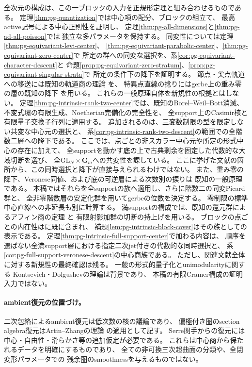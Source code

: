 全次元の構成は、この一ブロックの入力を正規形定理と組み合わせるものである。
定理\ref{thm:pg-quantization}では中心項の配分、ブロックの組立て、
最高active記号による中心正則性を証明し、
定理\ref{thm:pg-all-dimensions}と\ref{thm:pg-ad-all-poisson}では
独立な多パラメータを保持する。
同変性については定理\ref{thm:pg-equivariant-levi-center}、
\ref{thm:pg-equivariant-parabolic-center}、\ref{thm:pg-equivariant-zero-center}で
所定の群への同変な選択を、系\ref{cor:pg-equivariant-character-descent}と
命題\ref{prop:pg-equivariant-zero-stratum}、\ref{prop:pg-equivariant-singular-strata}で
所定の条件下の降下を証明する。
節点・尖点軌道への移送には既知の軌道商の理論
\cite[Propositions~7.12, 7.17]{PMilneGroups}を、
特異点直線の捻りにはgerbe上の重み零の層の既知の降下
\cite[Proposition~4.10, p.~1487]{PBerghSchnurerGerbes}を用いる。
これらの一般原理自体を新規性の根拠とはしない。
定理\ref{thm:pg-intrinsic-rank-two-center}では、既知のBorel--Weil--Bott消滅、
不変式環の有限生成、Noetherian完備化の完全性を、
全support上のCasimir核と有限量子交換子行列に適用する。
追加されるのは、三変数制限の型を限定しない共変な中心元の選択と、
系\ref{cor:pg-intrinsic-rank-two-descent}の範囲での全階数二層への降下である。
ここでは、点ごとの非スカラー中心元や所定の形式中心の存在に加えて、
全supportを動かす底の上で古典剰余を固定した代数的な大域切断を選び、
全$\mathrm{GL}_N\times\mathbf G_m$への共変性を課している。
ここに挙げた文献の箇所から、この同時選択と降下が直接与えられるわけではない。
また、重み零の降下、Veronese同値、および底の可逆層による次数別の捩りは
既知の一般原理である\cite{PBerghSchnurerGerbes,PSmithVeronese,PVdBNoncommP1Bundles}。
本稿ではそれらを全supportの族へ適用し、さらに階数二の同変Picard群と、
全非零階数層の安定化群を用いてgerbeの位数を決定する。
零制限の標準中心直線への非延長も別に計算する。
満supportの構成では、既知の還元群によるアフィン商の定理
\cite[\S2, Proposition~2.2, Theorem~2.1]{PArzhantsevMatsushima}と
有限射影加群の切断の持上げを用いる。
ブロックの点ごとの内在性は\cite[縮約二形式による復元補題]{PoissonCubic}に既に含まれ、
補題\ref{lem:pg-intrinsic-block-cover}はその族としての表示である。
定理\ref{thm:pg-intrinsic-full-support-center}で加わる内容は、
順序を選ばない全満support層における指定二次jet付きの代数的な同時選択と、
系\ref{cor:pg-full-support-veronese-descent}の中心商族である。
ただし、関連文献全体に対する新規性の最終確認は残る。
一般の形式的量子化とunimodularityに関する
Kontsevich・Dolgushevの理論\cite{PKontsevich,PDolgushev}は背景であり、
本稿の有限Cramer構成の証明入力ではない。


\paragraph{ambient復元の位置づけ。}
二次包絡によるambient復元は低次数の核の議論であり、
偏極付き圏のsection algebra復元はArtin--Zhangの理論
\cite{PAZAmbient}の適用として記す。
Serre関手からの復元には中心・自由性・滑らかさ等の追加仮定が必要である。
これらは中心商から保たれるデータを明確にするものであり、
全ての非可換三次超曲面の分類や、全閉変形パラメータでの
残余圏のsmoothnessを与えるものではない。

